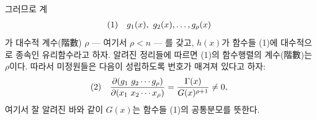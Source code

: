 
그러므로 계
\[
\begin{array}{@{}r@{\quad}l@{}}
(1)& g_1(x),\ g_2(x),\ldots,g_\rho(x)
\end{array}
\]
가 대수적 계수(階數) $\rho$ --- 여기서 $\rho<n$ --- 를 갖고, $h(x)$가 함수들 (1)에 대수적으로 종속인 유리함수라고 하자. 알려진 정리들에 따르면 (1)의 함수행렬의 계수(階數)는 $\rho$이다. 따라서 미정원들은 다음이 성립하도록 번호가 매겨져 있다고 하자:
\[
\begin{array}{@{}r@{\quad}l@{}}
(2)& \displaystyle
\frac{\partial(g_1\ g_2\cdots g_\rho)}{\partial(x_1\ x_2\cdots x_\rho)}
=\frac{\Gamma(x)}{G(x)^{\rho+1}}\ne0,
\end{array}
\]
여기서 잘 알려진 바와 같이 $G(x)$는 함수들 (1)의 공통분모를 뜻한다.

